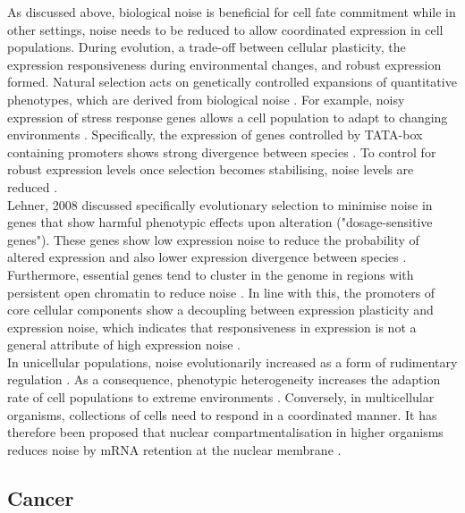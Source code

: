 As discussed above, biological noise is beneficial for cell fate commitment while in other settings, noise needs to be reduced to allow coordinated expression in cell populations. 
During evolution, a trade-off between cellular plasticity, the expression responsiveness during environmental changes, and robust expression formed. Natural selection acts on genetically controlled expansions of quantitative phenotypes, which are derived from biological noise \citep{Eldar2010}. 
For example, noisy expression of stress response genes allows a cell population to adapt to changing environments \citep{Lopez-Maury2009}. 
Specifically, the expression of genes controlled by TATA-box containing promoters shows strong divergence between species \citep{Tirosh2006}. 
To control for robust expression levels once selection becomes stabilising, noise levels are reduced \citep{Lopez-Maury2009, Eldar2010, Pires2016}. \\

Lehner, 2008 discussed specifically evolutionary selection to minimise noise in genes that show harmful phenotypic effects upon alteration ("dosage-sensitive genes"). 
These genes show low expression noise to reduce the probability of altered expression and also lower expression divergence between species \citep{Lehner2008}. 
Furthermore, essential genes tend to cluster in the genome in regions with persistent open chromatin to reduce noise \citep{Batada2007}. 
In line with this, the promoters of core cellular components show a decoupling between expression plasticity and expression noise, which indicates that responsiveness in expression is not a general attribute of high expression noise \citep{Lehner2010a}. \\

In unicellular populations, noise evolutionarily increased as a form of rudimentary regulation \citep{Wolf2015}. 
As a consequence, phenotypic heterogeneity increases the adaption rate of cell populations to extreme environments \cite{Bodi2017}. 
Conversely, in multicellular organisms, collections of cells need to respond in a coordinated manner. 
It has therefore been proposed that nuclear compartmentalisation in higher organisms reduces noise by mRNA retention at the nuclear membrane \citep{Battich2013, Stoeger2016}.

\subsection{Cancer}

